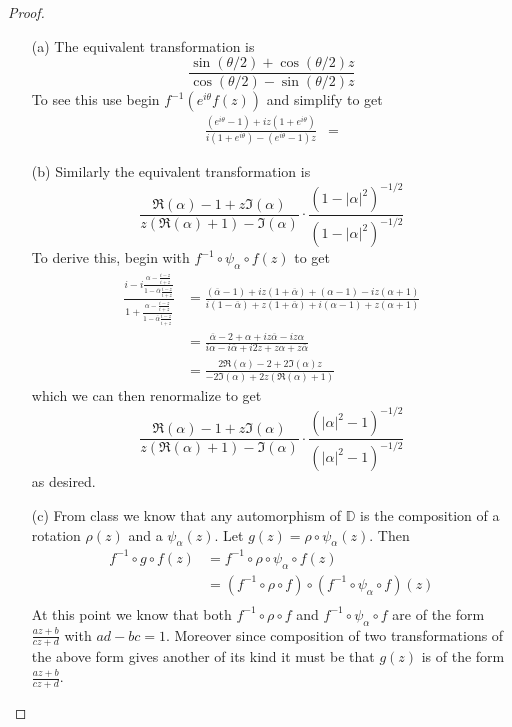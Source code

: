 \documentclass[10pt]{article}
\newcommand{\bb}[1]{\mathbb{#1}}
\newcommand{\conj}[1]{\overline{#1}}
\theoremstyle{remark}
\theoremstyle{remark}
\begin{document}
\begin{proof}
  \begin{enumerate}
  \item[(a)] The equivalent transformation is
    \[
      \frac{\sin(\theta/2)+\cos(\theta/2)z}{\cos(\theta/2)-\sin(\theta/2)z}
    \]
    To see this use begin $f^{-1}(e^{i\theta}f(z))$ and simplify to get
    \begin{align*}
      \frac{(e^{i\theta}-1)+iz(1+e^{i\theta})}{i(1+e^{i\theta})-(e^{i\theta}-1)z}&=
    \end{align*}
  \item[(b)] Similarly the equivalent transformation is
    \[
      \frac{\Re(\alpha)-1+z\Im(\alpha)}{z(\Re(\alpha)+1)-\Im(\alpha)}\cdot\frac{(1-|\alpha|^2)^{-1/2}}{(1-|\alpha|^2)^{-1/2}}
    \]
    To derive this, begin with $f^{-1}\circ\psi_\alpha\circ f(z)$ to get
    \begin{align*}
      \frac{i-i\frac{\alpha-\frac{i-z}{i+z}}{1-\conj{\alpha}\frac{i-z}{i+z}}}{1+\frac{\alpha-\frac{i-z}{i+z}}{1-\conj{\alpha}\frac{i-z}{i+z}}}&=\frac{(\conj{\alpha}-1)+iz(1+\conj{\alpha})+(\alpha-1)-iz(\alpha+1)}{i(1-\conj{\alpha})+z(1+\conj{\alpha})+i(\alpha-1)+z(\alpha+1)}\\
                                                                                                                          &=\frac{\conj{\alpha}-2+\alpha+iz\conj{\alpha}-iz\alpha}{i\alpha-i\conj{\alpha}+i2z+z\alpha+z\conj{\alpha}}\\
                                                                                                                          &=\frac{2\Re(\alpha)-2+2\Im(\alpha)z}{-2\Im(\alpha)+2z(\Re(\alpha)+1)}
    \end{align*}
    which we can then renormalize to get
    \[
      \frac{\Re(\alpha)-1+z\Im(\alpha)}{z(\Re(\alpha)+1)-\Im(\alpha)}\cdot\frac{(|\alpha|^2-1)^{-1/2}}{(|\alpha|^2-1)^{-1/2}}
    \]
    as desired.
  \item[(c)] From class we know that any automorphism of $\bb{D}$ is the
    composition of a rotation $\rho(z)$ and a $\psi_\alpha(z)$. Let $g(z)=\rho\circ\psi_\alpha(z)$.
    Then
    \begin{align*}
      f^{-1}\circ g\circ f(z) &= f^{-1}\circ\rho\circ\psi_\alpha \circ f(z)\\
                      &= (f^{-1}\circ\rho\circ f)\circ (f^{-1}\circ\psi_\alpha \circ f)(z)\\
    \end{align*}
    At this point we know that both $f^{-1}\circ\rho\circ f$ and $f^{-1}\circ\psi_\alpha \circ f$
    are of the form $\frac{az+b}{cz+d}$ with $ad-bc=1$. Moreover since
    composition of two transformations of the above form gives another of
    its kind it must be that $g(z)$ is of the form $\frac{az+b}{cz+d}$.
  \end{enumerate}
\end{proof}
\end{document}
